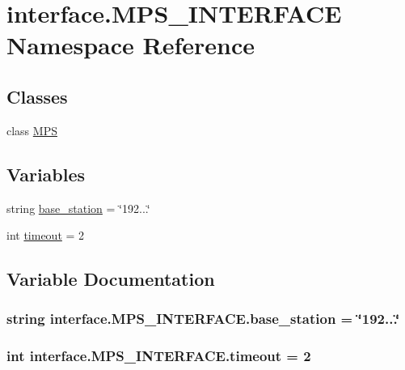 \hypertarget{namespaceinterface_1_1MPS__INTERFACE}{}\section{interface.\+M\+P\+S\+\_\+\+I\+N\+T\+E\+R\+F\+A\+C\+E Namespace Reference}
\label{namespaceinterface_1_1MPS__INTERFACE}
\subsection*{Classes}
\begin{DoxyCompactItemize}
\item 
class \hyperlink{classinterface_1_1MPS__INTERFACE_1_1MPS}{M\+P\+S}
\end{DoxyCompactItemize}
\subsection*{Variables}
\begin{DoxyCompactItemize}
\item 
string \hyperlink{namespaceinterface_1_1MPS__INTERFACE_abf005c90b33c5269b735be7080beafae}{base\+\_\+station} = \char`\"{}192...\char`\"{}
\item 
int \hyperlink{namespaceinterface_1_1MPS__INTERFACE_a8f99977d3b568944bdce9365f8f103a7}{timeout} = 2
\end{DoxyCompactItemize}


\subsection{Variable Documentation}
\hypertarget{namespaceinterface_1_1MPS__INTERFACE_abf005c90b33c5269b735be7080beafae}{}
\subsubsection[{base\+\_\+station}]{\setlength{\rightskip}{0pt plus 5cm}string interface.\+M\+P\+S\+\_\+\+I\+N\+T\+E\+R\+F\+A\+C\+E.\+base\+\_\+station = \char`\"{}192...\char`\"{}}\label{namespaceinterface_1_1MPS__INTERFACE_abf005c90b33c5269b735be7080beafae}
\hypertarget{namespaceinterface_1_1MPS__INTERFACE_a8f99977d3b568944bdce9365f8f103a7}{}
\subsubsection[{timeout}]{\setlength{\rightskip}{0pt plus 5cm}int interface.\+M\+P\+S\+\_\+\+I\+N\+T\+E\+R\+F\+A\+C\+E.\+timeout = 2}\label{namespaceinterface_1_1MPS__INTERFACE_a8f99977d3b568944bdce9365f8f103a7}
